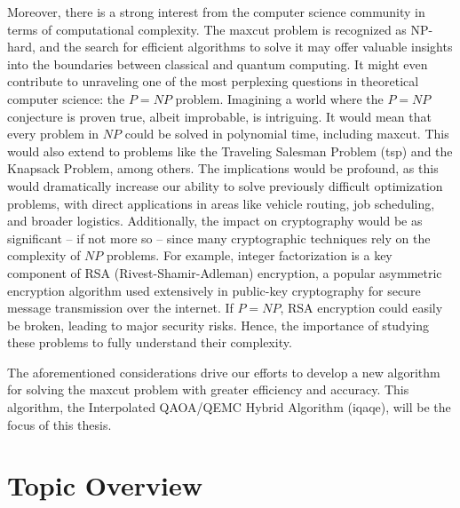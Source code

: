 Moreover, there is a strong interest from the computer science community in terms of computational complexity. The \acrshort{maxcut} problem is recognized as NP-hard, and the search for efficient algorithms to solve it may offer valuable insights into the boundaries between classical and quantum computing. It might even contribute to unraveling one of the most perplexing questions in theoretical computer science: the $P = NP$ problem. Imagining a world where the $P = NP$ conjecture is proven true, albeit improbable, is intriguing. It would mean that every problem in $NP$ could be solved in polynomial time, including \acrshort{maxcut}. This would also extend to problems like the Traveling Salesman Problem (\acrshort{tsp}) and the Knapsack Problem, among others. The implications would be profound, as this would dramatically increase our ability to solve previously difficult optimization problems, with direct applications in areas like vehicle routing, job scheduling, and broader logistics. Additionally, the impact on cryptography would be as significant – if not more so – since many cryptographic techniques rely on the complexity of $NP$ problems. For example, integer factorization is a key component of RSA (Rivest-Shamir-Adleman) encryption, a popular asymmetric encryption algorithm used extensively in public-key cryptography for secure message transmission over the internet. If $P = NP$, RSA encryption could easily be broken, leading to major security risks. Hence, the importance of studying these problems to fully understand their complexity.

The aforementioned considerations drive our efforts to develop a new algorithm for solving the \acrshort{maxcut} problem with greater efficiency and accuracy. This algorithm, the Interpolated QAOA/QEMC Hybrid Algorithm (\acrshort{iqaqe}), will be the focus of this thesis.


\section{Topic Overview}
\label{section:overview}


